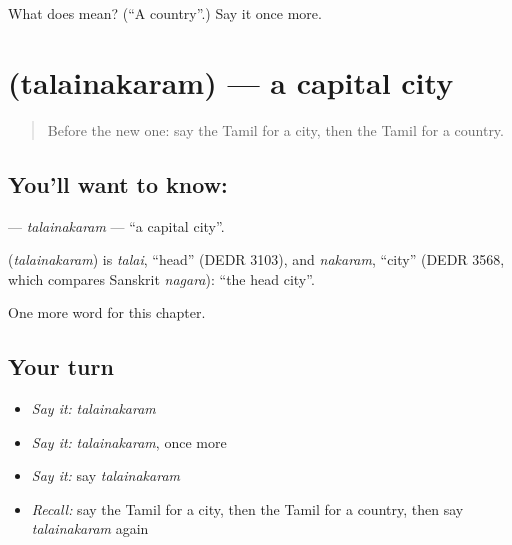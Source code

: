 \begin{tcolorbox}[breakable,colback=teal!4,colframe=teal!35!black,title={Before you move on}]
What does  mean? (\textquotedblleft{}A country\textquotedblright{}.) Say it once more.
\end{tcolorbox}
\section[\texorpdfstring{\ta{தலைநகரம்} (talainakaram)}{தலைநகரம் (talainakaram)}]{ (talainakaram) — a capital city}

\label{lesson:TA-C234-talainakaram}



\begin{quote}
Before the new one: say the Tamil for a city, then the Tamil for a country.
\end{quote}

\subsection*{You'll want to know: }
\textbf{} — \emph{talainakaram} — \textquotedblleft{}a capital city\textquotedblright{}.

\begin{cousinweb}
\textbf{} (\emph{talainakaram}) is \emph{talai}, \textquotedblleft{}head\textquotedblright{} (DEDR 3103), and \emph{nakaram}, \textquotedblleft{}city\textquotedblright{} (DEDR 3568, which compares Sanskrit \emph{nagara}): \textquotedblleft{}the head city\textquotedblright{}.
\end{cousinweb}

\begin{grammarlens}[title={What you've built}]
One more word for this chapter.
\end{grammarlens}

\subsection*{Your turn}
\begin{itemize}
\raggedright
  \item \emph{Say it:} \emph{talainakaram}
  \item \emph{Say it:} \emph{talainakaram}, once more
  \item \emph{Say it:} say \emph{talainakaram}
  \item \emph{Recall:} say the Tamil for a city, then the Tamil for a country, then say \emph{talainakaram} again
\end{itemize}

